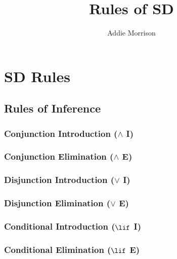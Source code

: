 \documentclass{hitec}
\title{Rules of SD}
\author{Addie Morrison}
\begin{document}
\maketitle
\section{SD Rules}
\subsection{Rules of Inference}
\subsubsection{Conjunction Introduction ($\land$ I)}
\subsubsection{Conjunction Elimination ($\land$ E)}
\subsubsection{Disjunction Introduction ($\lor$ I)}
\subsubsection{Disjunction Elimination ($\lor$ E)}
\subsubsection{Conditional Introduction ($\lif$ I)}
\subsubsection{Conditional Elimination ($\lif$ E)}
\end{document}
